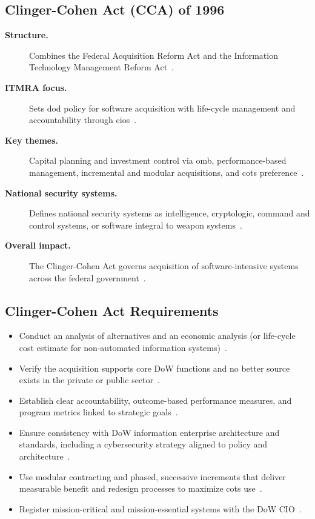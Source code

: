 \documentclass[../main.tex]{subfiles}
\begin{document}
\subsection{Clinger-Cohen Act (CCA) of 1996}
\begin{description}
  \item[\textbf{Structure.}] Combines the Federal Acquisition Reform Act and the Information Technology Management Reform Act~\autocite{edo-3-4-1-software-acquisition-environment-2025}.
  \item[\textbf{ITMRA focus.}] Sets \ac{dod} policy for software acquisition with life-cycle management and accountability through \acp{cio}~\autocite{edo-3-4-1-software-acquisition-environment-2025}.
  \item[\textbf{Key themes.}] Capital planning and investment control via \ac{omb}, performance-based management, incremental and modular acquisitions, and \ac{cots} preference~\autocite{edo-3-4-1-software-acquisition-environment-2025}.
  \item[\textbf{National security systems.}] Defines national security systems as intelligence, cryptologic, command and control systems, or software integral to weapon systems~\autocite{edo-3-4-1-software-acquisition-environment-2025}.
  \item[\textbf{Overall impact.}] The Clinger-Cohen Act governs acquisition of software-intensive systems across the federal government~\autocite{edo-3-4-1-software-acquisition-environment-2025}.
\end{description}

\subsection{Clinger-Cohen Act Requirements}
\begin{itemize}
  \item Conduct an analysis of alternatives and an economic analysis (or life-cycle cost estimate for non-automated information systems)~\autocite{edo-3-4-1-software-acquisition-environment-2025}.
  \item Verify the acquisition supports core DoW functions and no better source exists in the private or public sector~\autocite{edo-3-4-1-software-acquisition-environment-2025}.
  \item Establish clear accountability, outcome-based performance measures, and program metrics linked to strategic goals~\autocite{edo-3-4-1-software-acquisition-environment-2025}.
  \item Ensure consistency with DoW information enterprise architecture and standards, including a cybersecurity strategy aligned to policy and architecture~\autocite{edo-3-4-1-software-acquisition-environment-2025}.
  \item Use modular contracting and phased, successive increments that deliver measurable benefit and redesign processes to maximize \ac{cots} use~\autocite{edo-3-4-1-software-acquisition-environment-2025}.
  \item Register mission-critical and mission-essential systems with the DoW CIO~\autocite{edo-3-4-1-software-acquisition-environment-2025}.
\end{itemize}
\end{document}
